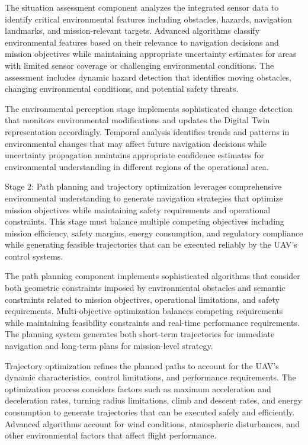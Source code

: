 The situation assessment component analyzes the integrated sensor data to identify critical environmental features including obstacles, hazards, navigation landmarks, and mission-relevant targets. Advanced algorithms classify environmental features based on their relevance to navigation decisions and mission objectives while maintaining appropriate uncertainty estimates for areas with limited sensor coverage or challenging environmental conditions. The assessment includes dynamic hazard detection that identifies moving obstacles, changing environmental conditions, and potential safety threats.

The environmental perception stage implements sophisticated change detection that monitors environmental modifications and updates the Digital Twin representation accordingly. Temporal analysis identifies trends and patterns in environmental changes that may affect future navigation decisions while uncertainty propagation maintains appropriate confidence estimates for environmental understanding in different regions of the operational area.

Stage 2: Path planning and trajectory optimization leverages comprehensive environmental understanding to generate navigation strategies that optimize mission objectives while maintaining safety requirements and operational constraints. This stage must balance multiple competing objectives including mission efficiency, safety margins, energy consumption, and regulatory compliance while generating feasible trajectories that can be executed reliably by the UAV's control systems.

The path planning component implements sophisticated algorithms that consider both geometric constraints imposed by environmental obstacles and semantic constraints related to mission objectives, operational limitations, and safety requirements. Multi-objective optimization balances competing requirements while maintaining feasibility constraints and real-time performance requirements. The planning system generates both short-term trajectories for immediate navigation and long-term plans for mission-level strategy.

Trajectory optimization refines the planned paths to account for the UAV's dynamic characteristics, control limitations, and performance requirements. The optimization process considers factors such as maximum acceleration and deceleration rates, turning radius limitations, climb and descent rates, and energy consumption to generate trajectories that can be executed safely and efficiently. Advanced algorithms account for wind conditions, atmospheric disturbances, and other environmental factors that affect flight performance.

